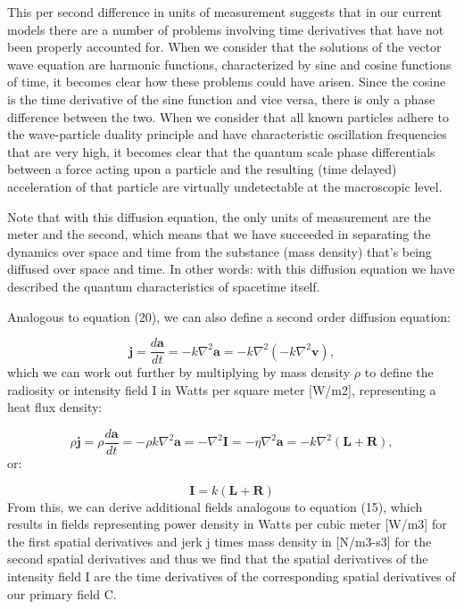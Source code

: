 \documentclass[twoside,final]{article}
\begin{document}
{This per second difference in units of measurement suggests that in our current
models there are a number of problems involving time derivatives that have not
been properly accounted for. When we consider that the solutions of the vector
wave equation are harmonic functions, characterized by sine and cosine functions
of time, it becomes clear how these problems could have arisen. Since the cosine
is the time derivative of the sine function and vice versa, there is only a
phase difference between the two. When we consider that all known particles
adhere to the wave-particle duality principle and have characteristic
oscillation frequencies that are very high, it becomes clear that the quantum
scale phase differentials between a force acting upon a particle and the
resulting (time delayed) acceleration of that particle are virtually
undetectable at the macroscopic level.  

Note that with this diffusion equation, the only units of measurement are the
meter and the second, which means that we have succeeded in separating the
dynamics over space and time from the substance (mass density) that's being
diffused over space and time. In other words: with this diffusion equation we
have described the quantum characteristics of spacetime itself. 

Analogous to equation (20), we can also define a second order diffusion equation:

\begin{equation}
\boldsymbol j=\frac{d\boldsymbol a}{\mathit{dt}}=-k{\nabla}^2\boldsymbol a=-k\nabla ^2(-k\nabla
^2\boldsymbol v),
\end{equation}
which we can work out further by multiplying by mass density $\rho $ to define
the radiosity or intensity field I in Watts per square meter [W/m2],
representing a heat flux density:

\begin{equation}
\rho \boldsymbol j=\rho \frac{d\boldsymbol a}{\mathit{dt}}=-\rho k\nabla ^2\boldsymbol a=-\nabla
^2\boldsymbol I=-\eta \nabla ^2\boldsymbol a=-k\nabla ^2(\boldsymbol L+\boldsymbol R),
\end{equation}
or:

\begin{equation}
\boldsymbol I=k(\boldsymbol L+\boldsymbol R)
\end{equation}
From this, we can derive additional fields analogous to equation (15), which
results in fields representing power density in Watts per cubic meter [W/m3] for
the first spatial derivatives and jerk j times mass density in [N/m3{}-s3] for
the second spatial derivatives and thus we find that the spatial derivatives of
the intensity field I are the time derivatives of the corresponding spatial
derivatives of our primary field C.

}
\end{document}
